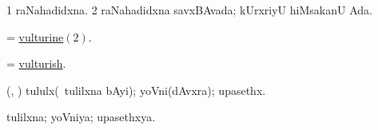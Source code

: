 \bentry
{} 
\gl{\gu}
\expl{}
\bmng
\bnum
\num{1} raNahadidxna. 
\hypertarget{vulturine(2)}{} 
\num{2} raNahadidxna savxBAvada; kUrxriyU hiMsakanU Ada. 
\enum
\emng
\eentry

\bentry
{} 
\gl{\gu}
\expl{}
\bmng
 = \hyperlink{vulturine(2)}{vulturine\((2)\)}. 
\emng
\eentry

\bentry
{} 
\gl{\gu}
\expl{}
\bmng
 = \hyperlink{vulturish}{vulturish}. 
\emng
\eentry

\bentry
{} 
\gl{\nA}
\bmng
 (\aMrashA, \pArxvi) tululx(\kanmu\ tulilxna bAyi); yoVni(dAvxra); upasethx. 
\emng
\eentry

\bentry
{} 
\gl{\gu}
\expl{}
\bmng
 tulilxna; yoVniya; upasethxya. 
\emng
\eentry

\newpage

